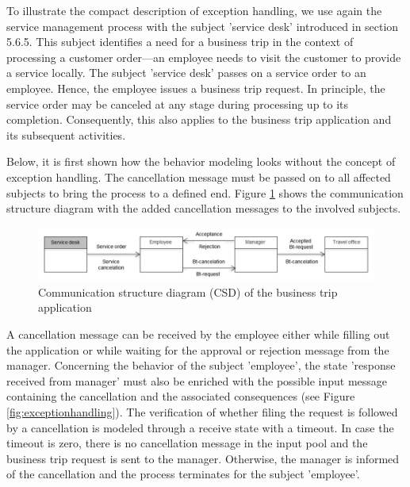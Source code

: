 To illustrate the compact description of exception handling, we use again the service management process with the subject 'service desk' introduced in section 5.6.5. This subject identifies a need for a business trip in the context of processing a customer order—an employee needs to visit the customer to provide a service locally. The subject 'service desk' passes on a service order to an employee. Hence, the employee issues a business trip request. In principle, the service order may be canceled at any stage during processing up to its completion. Consequently, this also applies to the business trip application and its subsequent activities.

Below, it is first shown how the behavior modeling looks without the concept of exception handling. The cancellation message must be passed on to all affected subjects to bring the process to a defined end. Figure \ref{fig:sid-exception} shows the communication structure diagram with the added cancellation messages to the involved subjects.

\begin{figure}[ph!]
	\centering
	\includegraphics[width=0.7\linewidth]{Figures/Ontology/SubjectExecution/SID-Exception}
	\caption[Communication structure diagram (CSD) of the business trip application]{Communication structure diagram (CSD) of the business trip application}
	\label{fig:sid-exception}
\end{figure}

A cancellation message can be received by the employee either while filling out the application or while waiting for the approval or rejection message from the manager. Concerning the behavior of the subject 'employee', the state 'response received from manager' must also be enriched with the possible input message containing the cancellation and the associated consequences (see Figure \ref{fig:exceptionhandling}). The verification of whether filing the request is followed by a cancellation is modeled through a receive state with a timeout. In case the timeout is zero, there is no cancellation message in the input pool and the business trip request is sent to the manager. Otherwise, the manager is informed of the cancellation and the process terminates for the subject 'employee'.


